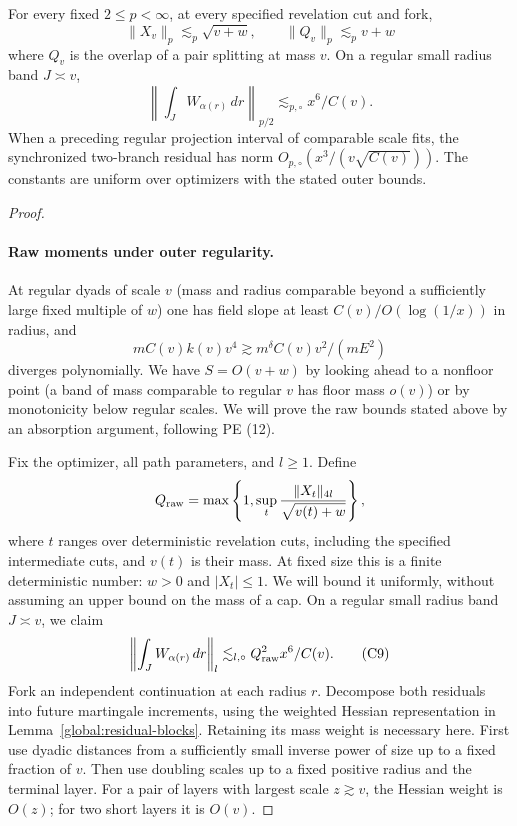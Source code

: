 \begin{lemma}\label{bud:outer-moments}
For every fixed $2\le p<\infty$, at every specified revelation cut and fork,
\[
 \|X_v\|_p\lesssim_p\sqrt{v+w},\qquad \|Q_v\|_p\lesssim_p v+w              \tag{C8}\label{eq:C8}
\]
where $Q_v$ is the overlap of a pair splitting at mass $v$.
On a regular small radius band $J\asymp v$,
\[
 \left\|\int_J W_{\alpha(r)}\,dr\right\|_{p/2}
 \lesssim_{p,\circ}x^6/C(v).
\]
When a preceding regular projection interval of comparable scale fits,
the synchronized two-branch residual has norm
$O_{p,\circ}(x^3/(v\sqrt{C(v)}))$.
The constants are uniform over optimizers with the stated outer bounds.
\end{lemma}
\begin{proof}
\leavevmode\par
\paragraph{Raw moments under outer regularity.} At regular dyads of scale \(v\) (mass and radius comparable beyond a sufficiently large fixed multiple of \(w\)) one has field slope at least \(C(v)/O(\log(1/x))\) in radius, and
\[
 m C(v)k(v)v^4\gtrsim m^\delta C(v)v^2/(mE^2)
\]
diverges polynomially. We have \(S=O(v+w)\) by looking ahead to a nonfloor point (a band of mass comparable to regular \(v\) has floor mass \(o(v)\)) or by monotonicity below regular scales. We will prove the raw bounds stated above by an absorption argument, following PE (12).

Fix the optimizer, all path parameters, and \(l\ge1\). Define
\[
 Q_{\rm raw}=\max\left\{1,
   \sup_t\frac{\|X_t\|_{4l}}{\sqrt{v(t)+w}}\right\},
\]
where \(t\) ranges over deterministic revelation cuts, including the
specified intermediate cuts, and \(v(t)\) is their mass. At fixed size
this is a finite deterministic number: \(w>0\) and \(|X_t|\le1\).
We will bound it uniformly, without assuming an upper bound on the
mass of a cap. On a regular small radius band \(J\asymp v\), we claim
\[
 \left\|\int_J W_{\alpha(r)}\,dr\right\|_l
    \lesssim_{l,\circ} Q_{\rm raw}^2 x^6/C(v).                            \tag{C9}\label{eq:C9}
\]
Fork an independent continuation at each radius \(r\). Decompose both
residuals into future martingale increments, using the weighted Hessian
representation in Lemma~\ref{global:residual-blocks}. Retaining
its mass weight is necessary here. First use dyadic distances from a
sufficiently small inverse power of size up to a fixed fraction of
\(v\). Then use doubling scales up to a fixed positive radius and the
terminal layer. For a pair of layers with largest scale \(z\gtrsim v\),
the Hessian weight is \(O(z)\); for two short layers it is \(O(v)\).


\end{proof}
